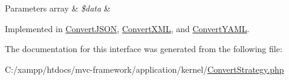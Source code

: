 \begin{DoxyParams}[1]{Parameters}
array & {\em \$data} & \\
\hline
\end{DoxyParams}


Implemented in \hyperlink{class_convert_j_s_o_n_a41444ea294bbd35a6c07ef4e9faeae10}{Convert\+J\+S\+O\+N}, \hyperlink{class_convert_x_m_l_a41444ea294bbd35a6c07ef4e9faeae10}{Convert\+X\+M\+L}, and \hyperlink{class_convert_y_a_m_l_a41444ea294bbd35a6c07ef4e9faeae10}{Convert\+Y\+A\+M\+L}.



The documentation for this interface was generated from the following file\+:\begin{DoxyCompactItemize}
\item 
C\+:/xampp/htdocs/mvc-\/framework/application/kernel/\hyperlink{_convert_strategy_8php}{Convert\+Strategy.\+php}\end{DoxyCompactItemize}
